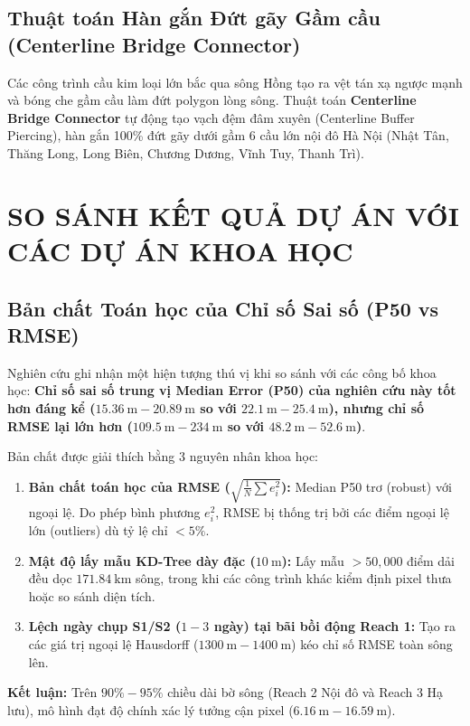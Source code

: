 \documentclass[11pt,a4paper]{article}
\begin{document}
\subsection{Thuật toán Hàn gắn Đứt gãy Gầm cầu (Centerline Bridge Connector)}
Các công trình cầu kim loại lớn bắc qua sông Hồng tạo ra vệt tán xạ ngược mạnh và bóng che gầm cầu làm đứt polygon lòng sông. Thuật toán \textbf{Centerline Bridge Connector} tự động tạo vạch đệm đâm xuyên (Centerline Buffer Piercing), hàn gắn 100\% đứt gãy dưới gầm 6 cầu lớn nội đô Hà Nội (Nhật Tân, Thăng Long, Long Biên, Chương Dương, Vĩnh Tuy, Thanh Trì).

\section{SO SÁNH KẾT QUẢ DỰ ÁN VỚI CÁC DỰ ÁN KHOA HỌC}

\subsection{Bản chất Toán học của Chỉ số Sai số (P50 vs RMSE)}
Nghiên cứu ghi nhận một hiện tượng thú vị khi so sánh với các công bố khoa học: \textbf{Chỉ số sai số trung vị Median Error (P50) của nghiên cứu này tốt hơn đáng kể ($15.36~\text{m} - 20.89~\text{m}$ so với $22.1~\text{m} - 25.4~\text{m}$), nhưng chỉ số RMSE lại lớn hơn ($109.5~\text{m} - 234~\text{m}$ so với $48.2~\text{m} - 52.6~\text{m}$)}.

Bản chất được giải thích bằng 3 nguyên nhân khoa học:
\begin{enumerate}
    \item \textbf{Bản chất toán học của RMSE ($\sqrt{\frac{1}{N}\sum e_i^2}$):} Median P50 trơ (robust) với ngoại lệ. Do phép bình phương $e_i^2$, RMSE bị thống trị bởi các điểm ngoại lệ lớn (outliers) dù tỷ lệ chỉ $< 5\%$.
    \item \textbf{Mật độ lấy mẫu KD-Tree dày đặc ($10~\text{m}$):} Lấy mẫu $> 50,000$ điểm dải đều dọc $171.84~\text{km}$ sông, trong khi các công trình khác kiểm định pixel thưa hoặc so sánh diện tích.
    \item \textbf{Lệch ngày chụp S1/S2 ($1 - 3$ ngày) tại bãi bồi động Reach 1:} Tạo ra các giá trị ngoại lệ Hausdorff ($1300~\text{m} - 1400~\text{m}$) kéo chỉ số RMSE toàn sông lên.
\end{enumerate}
\textbf{Kết luận:} Trên $90\% - 95\%$ chiều dài bờ sông (Reach 2 Nội đô và Reach 3 Hạ lưu), mô hình đạt độ chính xác lý tưởng cận pixel ($6.16~\text{m} - 16.59~\text{m}$).
\end{document}
